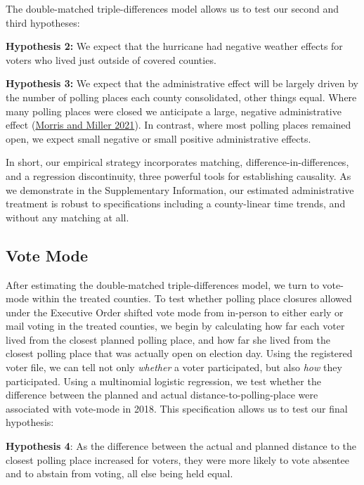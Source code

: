 \documentclass[
  12pt,
]{article}
\begin{document}
The double-matched triple-differences model allows us to test our second and third hypotheses:

\textbf{Hypothesis 2:} We expect that the hurricane had negative weather effects for voters who lived just outside of covered counties.

\textbf{Hypothesis 3:} We expect that the administrative effect will be largely driven by the number of polling places each county consolidated, other things equal. Where many polling places were closed we anticipate a large, negative administrative effect (\protect\hyperlink{ref-Morris2021}{Morris and Miller 2021}). In contrast, where most polling places remained open, we expect small negative or small positive administrative effects.

In short, our empirical strategy incorporates matching, difference-in-differences, and a regression discontinuity, three powerful tools for establishing causality. As we demonstrate in the Supplementary Information, our estimated administrative treatment is robust to specifications including a county-linear time trends, and without any matching at all.

\hypertarget{vote-mode}{%
\subsection*{Vote Mode}\label{vote-mode}}

After estimating the double-matched triple-differences model, we turn to vote-mode within the treated counties. To test whether polling place closures allowed under the Executive Order shifted vote mode from in-person to either early or mail voting in the treated counties, we begin by calculating how far each voter lived from the closest planned polling place, and how far she lived from the closest polling place that was actually open on election day. Using the registered voter file, we can tell not only \emph{whether} a voter participated, but also \emph{how} they participated. Using a multinomial logistic regression, we test whether the difference between the planned and actual distance-to-polling-place were associated with vote-mode in 2018. This specification allows us to test our final hypothesis:

\textbf{Hypothesis 4}: As the difference between the actual and planned distance to the closest polling place increased for voters, they were more likely to vote absentee and to abstain from voting, all else being held equal.
\end{document}
